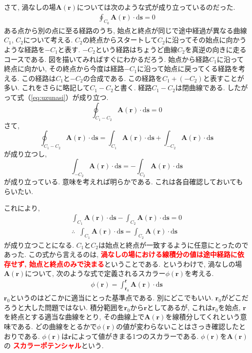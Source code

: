 さて, 渦なしの場$\bm{A}(\bm{r})$については次のような式が成り立っているのだった. 
\begin{eqnarray}
\oint_{C_0}^{} \bm{A}(\bm{r}) \cdot \mathrm{d} \bm{s} = 0
\label{eq:uzunasi}
\end{eqnarray}
ある点から別の点に至る経路のうち, 始点と終点が同じで途中経過が異なる曲線$C_1$, $C_2$について考える. 
$C_2$の終点からスタートして$C_2$に沿ってその始点に向かうような経路を$-C_1$と表す. 
$-C_2$という経路はちょうど曲線$C_2$を真逆の向きに走るコースである. 図を描いてみればすぐにわかるだろう. 
始点から経路$C_1$に沿って終点に向かい, その終点から今度は経路$-C_1$に沿って始点に戻ってくる経路を考える. 
この経路は$C_1$と$-C_2$の合成である. この経路を$C_1+(-C_2)$と表すことが多い. 
これをさらに略記して$C_1-C_2$と書く. 経路$C_1-C_2$は閉曲線である. 
したがって式（\ref{eq:uzunasi}）が成り立つ. 
$$
\oint_{C_1-C_2}^{} \bm{A}(\bm{r}) \cdot \mathrm{d} \bm{s} = 0
$$
さて, 
$$
\oint_{C_1-C_2}^{} \bm{A}(\bm{r}) \cdot \mathrm{d} \bm{s} = 
\int_{C_1}^{} \bm{A}(\bm{r}) \cdot \mathrm{d} \bm{s} + \int_{-C_2}^{} \bm{A}(\bm{r}) \cdot \mathrm{d} \bm{s}
$$
が成り立つし, 
$$
\int_{-C_2}^{} \bm{A}(\bm{r}) \cdot \mathrm{d} \bm{s} = 
- \int_{C_2}^{} \bm{A}(\bm{r}) \cdot \mathrm{d} \bm{s}
$$
が成り立っている. 意味を考えれば明らかである. これは各自確認しておいてもらいたい. 

これにより, 
\begin{eqnarray*}
\int_{C_1}^{} \bm{A}(\bm{r}) \cdot \mathrm{d} \bm{s} - \int_{C_2}^{} \bm{A}(\bm{r}) \cdot \mathrm{d} \bm{s} = 0 \\
\therefore \; \; 
\int_{C_1}^{} \bm{A}(\bm{r}) \cdot \mathrm{d} \bm{s} = \int_{C_2}^{} \bm{A}(\bm{r}) \cdot \mathrm{d} \bm{s}
\end{eqnarray*}
が成り立つことになる. $C_1$と$C_2$は始点と終点が一致するように任意にとったのであった. この式から言えるのは, 
\textbf{\textcolor{red}{渦なしの場における線積分の値は途中経路に依存せず, 始点と終点のみで決まる}}ということである. 
というわけで, 渦なしの場$\bm{A}(\bm{r})$について, 次のような式で定義されるスカラー$\phi(\bm{r})$を考える. 
\begin{eqnarray}
\phi (\bm{r}) = \int_{\bm{r}_0}^{\bm{r}} \bm{A}(\bm{r}) \cdot \mathrm{d} \bm{s}
\label{eq:sukara}
\end{eqnarray}
$\bm{r}_0$というのはどこかに適当にとった基準点である. 別にどこでもいい. $\bm{r}_0$がどこだろうと大した問題ではない. 
積分範囲を$\bm{r}_0$から$\bm{r}$としてあるが, これは$\bm{r}_0$を始点, $\bm{r}$を終点とする適当な曲線をとり, 
その曲線上で$\bm{A}(\bm{r})$を線積分してくれという意味である. 
どの曲線をとるかで$\phi(\bm{r})$の値が変わらないことはさっき確認したとおりである. 
$\phi(\bm{r})$は$\bm{r}$によって値がきまる1つのスカラーである. 
$\phi(\bm{r})$を$\bm{A}(\bm{r})$の
\textbf{\textcolor{red}{スカラーポテンシャル}}という. 

